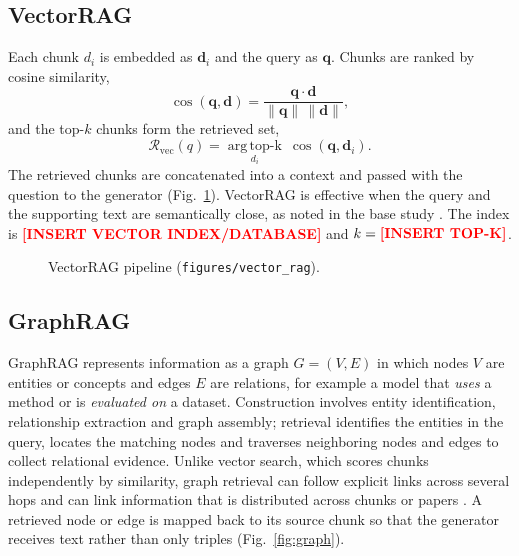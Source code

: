 \documentclass[conference]{IEEEtran}
\newcommand{\ph}[1]{\textbf{\textcolor{red}{[#1]}}}
\begin{document}
\subsection{VectorRAG}
\label{sec:vector}
Each chunk $d_i$ is embedded as $\mathbf{d}_i$ and the query as $\mathbf{q}$. Chunks are ranked by cosine similarity,
\begin{equation}
\cos(\mathbf{q},\mathbf{d})=\frac{\mathbf{q}\cdot\mathbf{d}}{\|\mathbf{q}\|\,\|\mathbf{d}\|},
\label{eq:cos}
\end{equation}
and the top-$k$ chunks form the retrieved set,
\begin{equation}
\mathcal{R}_{\text{vec}}(q)=\operatorname*{arg\,top\text{-}k}_{d_i}\ \cos(\mathbf{q},\mathbf{d}_i).
\label{eq:topk}
\end{equation}
The retrieved chunks are concatenated into a context and passed with the question to the generator (Fig.~\ref{fig:vector}). VectorRAG is effective when the query and the supporting text are semantically close, as noted in the base study \cite{ghanadian2026base}. The index is \ph{INSERT VECTOR INDEX/DATABASE} and $k=\ph{INSERT TOP-K}$.

\begin{figure}[t]
\centering
{}
\caption{VectorRAG pipeline (\texttt{figures/vector\_rag}).}
\label{fig:vector}
\end{figure}

\subsection{GraphRAG}
\label{sec:graph}
GraphRAG represents information as a graph $G=(V,E)$ in which nodes $V$ are entities or concepts and edges $E$ are relations, for example a model that \emph{uses} a method or is \emph{evaluated on} a dataset. Construction involves entity identification, relationship extraction and graph assembly; retrieval identifies the entities in the query, locates the matching nodes and traverses neighboring nodes and edges to collect relational evidence. Unlike vector search, which scores chunks independently by similarity, graph retrieval can follow explicit links across several hops and can link information that is distributed across chunks or papers \cite{edge2024graphrag,peng2024graphragsurvey}. A retrieved node or edge is mapped back to its source chunk so that the generator receives text rather than only triples (Fig.~\ref{fig:graph}).
\end{document}
